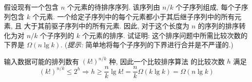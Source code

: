 \documentclass[boxes]{homework}
\begin{document}
\begin{problem}
假设现有一个包含 $n$ 个元素的待排序序列. 该序列由 $n / k$ 个子序列组成, 每个子序
列包含 $k$ 个元素. 一个给定子序列中的每个元素都小于其后继子序列中的所有元素, 且
大于其前驱子序列中的所有元素. 因此, 对于这个长度为 $n$ 的序列的排序转化为对
$n / k$ 个子序列的 $k$ 个元素的排序. 试证明: 这个排序问题中所需比较次数的下界是
$\Omega(n\lg k)$. (\emph{提示:} 简单地将每个子序列的下界进行合并是不严谨的.)
\end{problem}
\begin{solution}
    输入数据可能的排列数有 ${\left( k !\right)}^{n / k}$ 种, 因此一个比较排序算法
    的比较次数 $h$ 满足
    \begin{equation}
        {\left( k!\right)}^{n / k} \leqslant 2^{h} \Rightarrow
        h \geqslant \frac{ n }{ k } \lg k! = \frac{ n }{ k } \Omega(k \lg k)
        = \Omega(n \lg k)
    \end{equation}
\end{solution}
\end{document}
